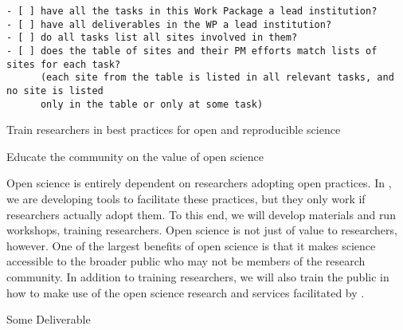 \begin{draft}
\begin{verbatim}
- [ ] have all the tasks in this Work Package a lead institution?
- [ ] have all deliverables in the WP a lead institution?
- [ ] do all tasks list all sites involved in them?
- [ ] does the table of sites and their PM efforts match lists of sites for each task?
      (each site from the table is listed in all relevant tasks, and no site is listed
      only in the table or only at some task)
\end{verbatim}
\end{draft}

\begin{workpackage}[id=education,wphases=0-48,swsites,
  title=Education and Dissemination,
  short=Education,
  lead=SRL,
  QSRM=4,
  SRLRM=12,
  UIORM=4,
  UPSUDRM=16,
  XFELRM=8,
]
\begin{wpobjectives}
 \begin{compactitem}
   \item Train researchers in best practices for open and reproducible science
   \item Educate the community on the value of open science
 \end{compactitem}
\end{wpobjectives}

\begin{wpdescription}

Open science is entirely dependent on researchers adopting open practices.
In \TheProject, we are developing tools to facilitate these practices,
but they only work if researchers actually adopt them.
To this end, we will develop materials and run workshops,
training researchers.
Open science is not just of value to researchers, however.
One of the largest benefits of open science is that it makes science accessible to the broader public
who may not be members of the research community.
In addition to training researchers,
we will also train the public in how to make use of the open science research and services facilitated by \TheProject.

\end{wpdescription}

\begin{tasklist}
% 

\end{tasklist}




\begin{wpdelivs}
\begin{wpdeliv}[due=1,miles=startup,id=infrastructure,dissem=PU,nature=DEC,lead=SRL]
  {Some Deliverable}
\end{wpdeliv}

\end{wpdelivs}
\end{workpackage}

